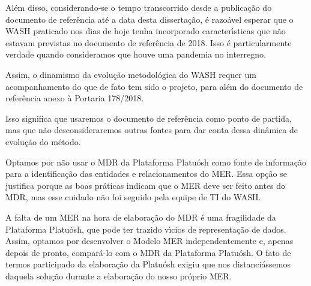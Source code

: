 \documentclass[
12pt,		%
openright,	%
twoside,  %
a4paper,			%
chapter=TITLE,		%
english,			%
french,				%
spanish,			%
brazil				%
]{USPSC-classe/USPSC}
\begin{document}
Al\'em disso, considerando-se o tempo transcorrido desde a publica\c{c}\~ao do documento de refer\^encia at\'e a data desta disserta\c{c}\~ao, \'e razo\'avel esperar que o WASH praticado nos dias de hoje tenha incorporado caracter\'{\i}sticas que n\~ao estavam previstas no documento de refer\^encia de 2018. Isso \'e particularmente verdade quando consideramos que houve uma pandemia no interregno.









Assim, o dinamismo da evolu\c{c}\~ao metodol\'ogica do WASH requer um acompanhamento do que de fato tem sido o projeto, para al\'em do documento de refer\^encia anexo \`a Portaria 178/2018.









Isso significa que usaremos o documento de refer\^encia como ponto de partida, mas que n\~ao desconsideraremos outras fontes para dar conta dessa din\^amica de evolu\c{c}\~ao do m\'etodo.









Optamos por n\~ao usar o MDR da Plataforma Platu\'osh como fonte de informa\c{c}\~ao para a identifica\c{c}\~ao das entidades e relacionamentos do MER. Essa op\c{c}\~ao se justifica porque as boas pr\'aticas indicam que o MER deve ser feito antes do MDR, mas esse cuidado n\~ao foi seguido pela equipe de TI do WASH.









A falta de um MER na hora de elabora\c{c}\~ao do MDR \'e uma fragilidade da Plataforma Platu\'osh, que pode ter trazido v\'{\i}cios de representa\c{c}\~ao de dados. Assim, optamos por desenvolver o Modelo MER independentemente e, apenas depois de pronto, compar\'a-lo com o MDR da Plataforma Platu\'osh. O fato de termos participado da elabora\c{c}\~ao da Platu\'osh exigiu que nos distanci\'assemos daquela solu\c{c}\~ao durante a elabora\c{c}\~ao do nosso pr\'oprio MER.
\end{document}

